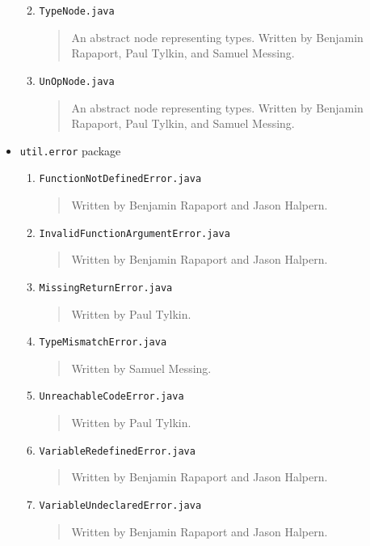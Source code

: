 \documentclass{report}
\begin{document}
\begin{itemize}
\begin{enumerate}
\begin{quotation}
\end{quotation}
\item \texttt{TypeNode.java}
\begin{quotation}
\noindent An abstract node representing types. Written by Benjamin Rapaport, Paul Tylkin, and Samuel Messing.
\end{quotation}
\item \texttt{UnOpNode.java}
\begin{quotation}
\noindent An abstract node representing types. Written by Benjamin Rapaport, Paul Tylkin, and Samuel Messing.
\end{quotation}
\end{enumerate} %
\item \texttt{util.error} package
\begin{enumerate}
\item \texttt{FunctionNotDefinedError.java}
\begin{quotation}
\noindent Written by Benjamin Rapaport and Jason Halpern. 
\end{quotation}
\item \texttt{InvalidFunctionArgumentError.java}
\begin{quotation}
\noindent Written by Benjamin Rapaport and Jason Halpern. 
\end{quotation}
\item \texttt{MissingReturnError.java}
\begin{quotation}
\noindent Written by Paul Tylkin. 
\end{quotation}
\item \texttt{TypeMismatchError.java}
\begin{quotation}
\noindent Written by Samuel Messing. 
\end{quotation}
\item \texttt{UnreachableCodeError.java}
\begin{quotation}
\noindent Written by Paul Tylkin. 
\end{quotation}
\item \texttt{VariableRedefinedError.java}
\begin{quotation}
\noindent Written by Benjamin Rapaport and Jason Halpern. 
\end{quotation}
\item \texttt{VariableUndeclaredError.java}
\begin{quotation}
\noindent Written by Benjamin Rapaport and Jason Halpern. 
\end{quotation}
\end{enumerate} %

\end{itemize}
\end{document}
